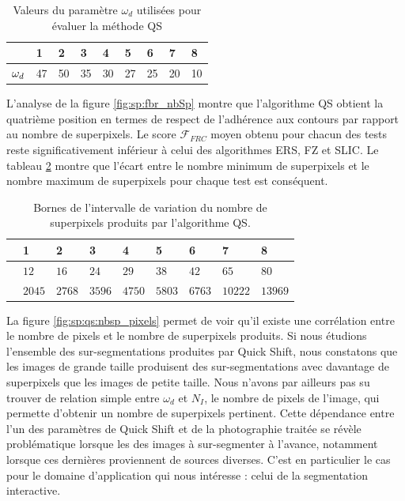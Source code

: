 \begin{table}[htb]
 \caption{Valeurs du paramètre $\omega_{d}$ utilisées pour évaluer la méthode QS}
\centering
\begin{tabular}{| l| l| l| l| l| l| l| l|  l|}
\hline
\cellcolor{gris}{Test} & 1 & 2 & 3 & 4 & 5 & 6&7 &8\\
\hline
$\cellcolor{gris}{\omega_{d}}$ & 47 & 50 &35 &30 &27 &25&20 &10\\
\hline
\end{tabular}
\label{tab:sp:paramQS}
\end{table}


L'analyse de la figure \ref{fig:sp:fbr_nbSp} montre que l'algorithme QS obtient la quatrième position en termes de respect de l'adhérence aux contours par rapport au nombre de superpixels. Le score $\mathcal{F}_{FRC}$ moyen obtenu pour chacun des tests reste significativement inférieur à celui des algorithmes ERS, FZ et SLIC.  Le tableau \ref{tab:sp:minmaxSpQS} montre que l'écart entre le nombre minimum de superpixels  et le nombre maximum de superpixels  pour chaque test est conséquent. 

\begin{table}[htb]
 \caption{Bornes de l'intervalle de variation du nombre de superpixels produits par l'algorithme QS.}
\centering
\begin{tabular}{| l| l| l| l| l| l| l| l|  l|}
\hline
\cellcolor{gris}{Test} & 1 & 2 & 3 & 4 & 5 & 6&7 &8\\
\hline
\cellcolor{gris}{min} & $12$  & $16$ &$24$ &$29$ &$38$ &$42$&$65$ &$80$\\
\hline
\cellcolor{gris}{max} &  $2045$  & $2768$ &$3596$ &$4750$ &$5803$ &$6763$&$10222$ &$13969$\\
\hline
\end{tabular}
\label{tab:sp:minmaxSpQS}
\end{table}

La figure \ref{fig:sp:qs:nbsp_pixels} permet de voir qu'il existe une corrélation entre le nombre de pixels et le nombre de superpixels produits. Si nous étudions l'ensemble des sur-segmentations produites par Quick Shift, nous constatons  que les images de grande taille produisent des sur-segmentations avec davantage de superpixels que les images de petite taille. Nous n'avons par ailleurs pas su trouver de relation simple entre $\omega_{d}$ et $N_{I}$, le nombre de pixels de l'image, qui permette d'obtenir un nombre de superpixels pertinent. Cette dépendance entre l'un des paramètres de Quick Shift et  de la photographie traitée se révèle problématique lorsque les  des images à sur-segmenter  à l'avance, notamment lorsque ces dernières proviennent de sources diverses. C'est en particulier le cas pour le domaine d'application qui nous intéresse : celui de la segmentation interactive.

